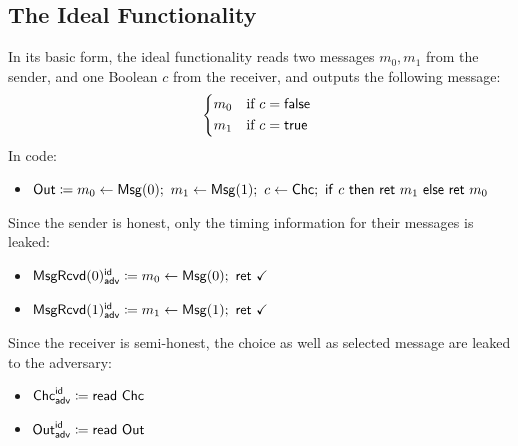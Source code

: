 \subsection{The Ideal Functionality}
In its basic form, the ideal functionality reads two messages $m_0,m_1$ from the sender, and one Boolean $c$ from the receiver, and outputs the following message:
\[\begin{cases*}
m_0 & \text{if $c = \false$} \\
m_1 & \text{if $c = \true$}
\end{cases*}\]
In code:
\begin{itemize}
\item $\Out \coloneqq m_0 \leftarrow \Msg(0); \ m_1 \leftarrow \Msg(1); \ c \leftarrow \Chc; \ \ifte{c}{\ret{m_1}}{\ret{m_0}}$
\end{itemize}
Since the sender is honest, only the timing information for their messages is leaked:
\begin{itemize}
\item {\color{blue} $\LeakMsgRcvd(0)^\id_\adv \coloneqq m_0 \leftarrow \Msg(0); \ \ret{\checkmark}$}
\item {\color{blue} $\LeakMsgRcvd(1)^\id_\adv \coloneqq m_1 \leftarrow \Msg(1); \ \ret{\checkmark}$}
\end{itemize}
Since the receiver is semi-honest, the choice as well as selected message are leaked to the adversary:
\begin{itemize}
\item {\color{blue} $\mathsf{Chc}^{\mathsf{id}}_{\mathsf{adv}} \coloneqq \mathsf{read} \ \mathsf{Chc}$}
\item {\color{blue} $\mathsf{Out}^{\mathsf{id}}_{\mathsf{adv}} \coloneqq \mathsf{read} \ \mathsf{Out}$}
\end{itemize}

